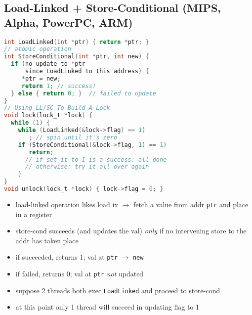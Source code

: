 \documentclass[8pt,a4paper,landscape]{extarticle}
\begin{document}
\begin{multicols*}{3}
\section*{Load-Linked + Store-Conditional (MIPS, Alpha, PowerPC, ARM)}
\begin{minipage}{.65\linewidth}
\begin{lstlisting}[language=c]
int LoadLinked(int *ptr) { return *ptr; }
// atomic operation
int StoreConditional(int *ptr, int new) {
  if (no update to *ptr
      since LoadLinked to this address) {
     *ptr = new;
     return 1; // success!
  } else { return 0; }  // failed to update
}
// Using LL/SC To Build A Lock
void lock(lock_t *lock) {
  while (1) {
    while (LoadLinked(&lock->flag) == 1)
       ; // spin until it's zero
    if (StoreConditional(&lock->flag, 1) == 1)
       return;
      // if set-it-to-1 is a success: all done
      // otherwise: try it all over again
    }
}
void unlock(lock_t *lock) { lock->flag = 0; }
\end{lstlisting}
\end{minipage}
\begin{minipage}{.35\linewidth}
  \flushleft
  \begin{itemize}
  \item load-linked operation likes load ix $\to$ fetch a value from addr \texttt{ptr} and place in a register
  \item store-cond succeeds (and updates the val) \emph{only} if no intervening store to the addr has taken place
  \item if succeeded, returns 1; val at \texttt{ptr} $\to$ \texttt{new}
  \item if failed, returns 0; val at \texttt{ptr} \emph{not} updated
  \item suppose 2 threads both exec \texttt{LoadLinked} and proceed to store-cond
  \item at this point only 1 thread will succeed in updating flag to 1
  \end{itemize}
\end{minipage}
\end{multicols*}
\end{document}
